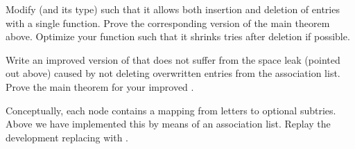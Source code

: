 \begin{isabellebody}
\begin{isamarkuptext}
\begin{exercise}
  Modify  (and its type) such that it allows both insertion and
  deletion of entries with a single function.  Prove the corresponding version 
  of the main theorem above.
  Optimize your function such that it shrinks tries after
  deletion if possible.
\end{exercise}

\begin{exercise}
  Write an improved version of  that does not suffer from the
  space leak (pointed out above) caused by not deleting overwritten entries
  from the association list. Prove the main theorem for your improved
  .
\end{exercise}

\begin{exercise}
  Conceptually, each node contains a mapping from letters to optional
  subtries. Above we have implemented this by means of an association
  list. Replay the development replacing 
  with .
\end{exercise}%
\end{isamarkuptext}%
\end{isabellebody}%
